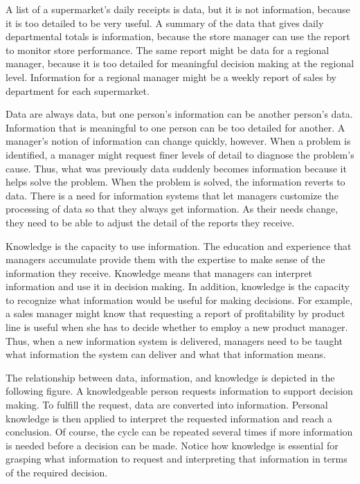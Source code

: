 \documentclass[
]{article}
\begin{document}
A list of a supermarket's daily receipts is data, but it is not
information, because it is too detailed to be very useful. A summary of
the data that gives daily departmental totals is information, because
the store manager can use the report to monitor store performance. The
same report might be data for a regional manager, because it is too
detailed for meaningful decision making at the regional level.
Information for a regional manager might be a weekly report of sales by
department for each supermarket.

Data are always data, but one person's information can be another
person's data. Information that is meaningful to one person can be too
detailed for another. A manager's notion of information can change
quickly, however. When a problem is identified, a manager might request
finer levels of detail to diagnose the problem's cause. Thus, what was
previously data suddenly becomes information because it helps solve the
problem. When the problem is solved, the information reverts to data.
There is a need for information systems that let managers customize the
processing of data so that they always get information. As their needs
change, they need to be able to adjust the detail of the reports they
receive.

Knowledge is the capacity to use information. The education and
experience that managers accumulate provide them with the expertise to
make sense of the information they receive. Knowledge means that
managers can interpret information and use it in decision making. In
addition, knowledge is the capacity to recognize what information would
be useful for making decisions. For example, a sales manager might know
that requesting a report of profitability by product line is useful when
she has to decide whether to employ a new product manager. Thus, when a
new information system is delivered, managers need to be taught what
information the system can deliver and what that information means.

The relationship between data, information, and knowledge is depicted in
the following figure. A knowledgeable person requests information to
support decision making. To fulfill the request, data are converted into
information. Personal knowledge is then applied to interpret the
requested information and reach a conclusion. Of course, the cycle can
be repeated several times if more information is needed before a
decision can be made. Notice how knowledge is essential for grasping
what information to request and interpreting that information in terms
of the required decision.
\end{document}
